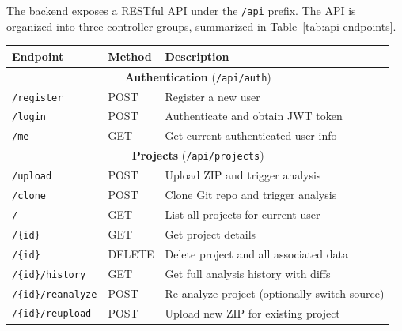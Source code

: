  \par The backend exposes a RESTful API \cite{Fielding2000} under the \texttt{/api} prefix. The API is organized into three controller groups, summarized in Table~\ref{tab:api-endpoints}.

\begin{table}[htbp]
    \centering
    \footnotesize
    \begin{tabular}{|l|l|p{6cm}|}
        \hline
        \textbf{Endpoint}          & \textbf{Method} & \textbf{Description}                             \\
        \hline\hline
        \multicolumn{3}{|c|}{\textbf{Authentication} (\texttt{/api/auth})} \\
        \hline
        \texttt{/register}         & POST            & Register a new user                              \\
        \hline
        \texttt{/login}            & POST            & Authenticate and obtain JWT token                \\
        \hline
        \texttt{/me}               & GET             & Get current authenticated user info              \\
        \hline\hline
        \multicolumn{3}{|c|}{\textbf{Projects} (\texttt{/api/projects})} \\
        \hline
        \texttt{/upload}           & POST            & Upload ZIP and trigger analysis                  \\
        \hline
        \texttt{/clone}            & POST            & Clone Git repo and trigger analysis              \\
        \hline
        \texttt{/}                 & GET             & List all projects for current user               \\
        \hline
        \texttt{/\{id\}}           & GET             & Get project details                              \\
        \hline
        \texttt{/\{id\}}           & DELETE          & Delete project and all associated data           \\
        \hline
        \texttt{/\{id\}/history}   & GET             & Get full analysis history with diffs             \\
        \hline
        \texttt{/\{id\}/reanalyze} & POST            & Re-analyze project (optionally switch source)    \\
        \hline
        \texttt{/\{id\}/reupload}  & POST            & Upload new ZIP for existing project              \\

\end{tabular}
\end{table}
